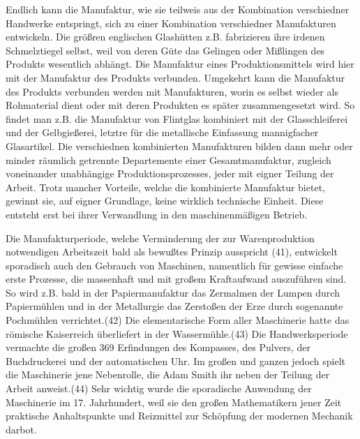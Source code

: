 {Endlich kann die Manufaktur, wie sie teilweis aus der Kombination
verschiedner Handwerke entspringt, sich zu einer Kombination
verschiedner Manufakturen entwickeln. Die größren englischen Glashütten
z.B. fabrizieren ihre irdenen Schmelztiegel selbst, weil von deren Güte
das Gelingen oder Mißlingen des Produkts wesentlich abhängt. Die
Manufaktur eines Produktionsmittels wird hier mit der Manufaktur des
Produkts verbunden. Umgekehrt kann die Manufaktur des Produkts verbunden
werden mit Manufakturen, worin es selbst wieder als Rohmaterial dient
oder mit deren Produkten es später zusammengesetzt wird. So findet man
z.B. die Manufaktur von Flintglas kombiniert mit der Glasschleiferei und
der Gelbgießerei, letztre für die metallische Einfassung mannigfacher
Glasartikel. Die verschiednen kombinierten Manufakturen bilden dann mehr
oder minder räumlich getrennte Departemente einer Gesamtmanufaktur,
zugleich voneinander unabhängige Produktionsprozesses, jeder mit eigner
Teilung der Arbeit. Trotz mancher Vorteile, welche die kombinierte
Manufaktur bietet, gewinnt sie, auf eigner Grundlage, keine wirklich
technische Einheit. Diese entsteht erst bei ihrer Verwandlung in den
maschinenmäßigen Betrieb.

Die Manufakturperiode, welche Verminderung der zur Warenproduktion
notwendigen Arbeitszeit bald als bewußtes Prinzip ausspricht (41),
entwickelt sporadisch auch den Gebrauch von Maschinen, namentlich für
gewisse einfache erste Prozesse, die massenhaft und mit großem
Kraftaufwand auszuführen sind. So wird z.B. bald in der Papiermanufaktur
das Zermalmen der Lumpen durch Papiermühlen und in der Metallurgie das
Zerstoßen der Erze durch sogenannte Pochmühlen verrichtet.(42) Die
elementarische Form aller Maschinerie hatte das römische Kaiserreich
überliefert in der Wassermühle.(43) Die Handwerksperiode vermachte die
großen \num{369} Erfindungen des Kompasses, des
Pulvers, der Buchdruckerei und der automatischen Uhr. Im großen und
ganzen jedoch spielt die Maschinerie jene Nebenrolle, die Adam Smith ihr
neben der Teilung der Arbeit anweist.(44) Sehr wichtig wurde die
sporadische Anwendung der Maschinerie im 17. Jahrhundert, weil sie den
großen Mathematikern jener Zeit praktische Anhaltspunkte und Reizmittel
zur Schöpfung der modernen Mechanik darbot.

}
